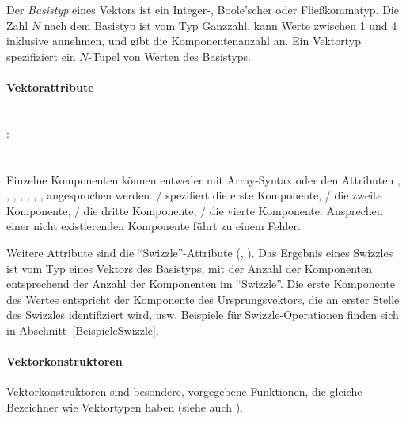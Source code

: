 

Der \emph{Basistyp} eines Vektors ist ein Integer-, Boole'scher oder Fließkommatyp.
Die Zahl $N$ nach dem Basistyp ist vom Typ
Ganzzahl, kann Werte zwischen 1 und 4 inklusive annehmen, und gibt die Komponentenanzahl an.
Ein Vektortyp spezifiziert ein $N$-Tupel von Werten
des Basistyps.



\paragraph{Vektorattribute}\label{Vektorattribute}
~\\
:\label{attr_vektor}\\
\hspace*{1cm} \\
\hspace*{1cm} \\
Einzelne Komponenten können entweder mit Array-Syntax oder den Attributen ,
, , , , , ,  angesprochen
werden. / spezifiert die erste Komponente,
/ die zweite Komponente, / die dritte Komponente,
/ die vierte Komponente. Ansprechen einer nicht existierenden Komponente
führt zu einem Fehler.

Weitere Attribute sind die "`Swizzle"'-Attribute (, ).
Das Ergebnis eines Swizzles ist vom Typ eines Vektors des Basistyps, mit der Anzahl der Komponenten
entsprechend der Anzahl der Komponenten im "`Swizzle"'. Die erste Komponente des Wertes entspricht
der Komponente des Ursprungsvektors, die an erster Stelle des Swizzles identifiziert wird, usw.
Beispiele für Swizzle-Operationen finden sich in Abschnitt~\ref{BeispieleSwizzle}.

\paragraph{Vektorkonstruktoren}\label{Vektorkonstruktoren}

Vektorkonstruktoren sind besondere, vorgegebene Funktionen, die gleiche Bezeichner wie Vektortypen haben
(siehe auch ).

